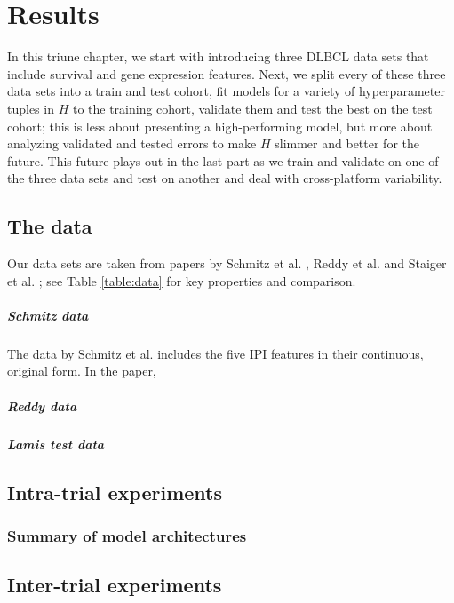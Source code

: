 \chapter{Results} \label{chap:results}

In this triune chapter, we start with introducing three DLBCL data sets that include 
survival and gene expression features. Next, we split every of these three data sets into 
a train and test cohort, fit models for a variety of hyperparameter tuples in $H$ to the training 
cohort, validate them and test the best on the test cohort; this is less about presenting a 
high-performing model, but more about analyzing validated and tested errors to make $H$ slimmer and 
better for the future. This future plays out in the last part as we train and validate on one of 
the three data sets and test on another and deal with cross-platform variability.

\section{The data}

Our data sets are taken from papers by Schmitz et al. \cite{schmitz18}, Reddy et al. \cite{reddy17}
and Staiger et al. \cite{staiger20}; see Table \ref{table:data} for key properties and comparison.



\paragraph{Schmitz data}
The data by Schmitz et al. includes the five IPI features in their continuous, original form. In 
the paper, 

\paragraph{Reddy data}

\paragraph{Lamis test data}

\section{Intra-trial experiments}

\subsection{Summary of model architectures}

\subsection{}

\section{Inter-trial experiments}